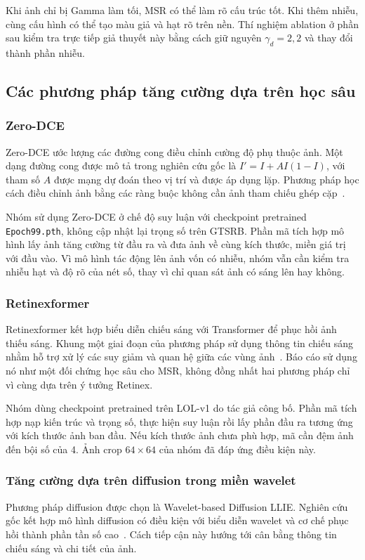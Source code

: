 Khi ảnh chỉ bị Gamma làm tối, MSR có thể làm rõ cấu trúc tốt. Khi thêm nhiễu, cùng cấu hình có thể tạo màu giả và hạt rõ trên nền. Thí nghiệm ablation ở phần sau kiểm tra trực tiếp giả thuyết này bằng cách giữ nguyên $\gamma_d=2,2$ và thay đổi thành phần nhiễu.

\subsection{Các phương pháp tăng cường dựa trên học sâu}
\subsubsection{Zero-DCE}
Zero-DCE ước lượng các đường cong điều chỉnh cường độ phụ thuộc ảnh. Một dạng đường cong được mô tả trong nghiên cứu gốc là $I'=I+A I(1-I)$, với tham số $A$ được mạng dự đoán theo vị trí và được áp dụng lặp. Phương pháp học cách điều chỉnh ảnh bằng các ràng buộc không cần ảnh tham chiếu ghép cặp~\cite{zerodce}.

Nhóm sử dụng Zero-DCE ở chế độ suy luận với checkpoint pretrained \texttt{Epoch99.pth}, không cập nhật lại trọng số trên GTSRB. Phần mã tích hợp mô hình lấy ảnh tăng cường từ đầu ra và đưa ảnh về cùng kích thước, miền giá trị với đầu vào. Vì mô hình tác động lên ảnh vốn có nhiễu, nhóm vẫn cần kiểm tra nhiễu hạt và độ rõ của nét số, thay vì chỉ quan sát ảnh có sáng lên hay không.

\subsubsection{Retinexformer}
Retinexformer kết hợp biểu diễn chiếu sáng với Transformer để phục hồi ảnh thiếu sáng. Khung một giai đoạn của phương pháp sử dụng thông tin chiếu sáng nhằm hỗ trợ xử lý các suy giảm và quan hệ giữa các vùng ảnh~\cite{retinexformer}. Báo cáo sử dụng nó như một đối chứng học sâu cho MSR, không đồng nhất hai phương pháp chỉ vì cùng dựa trên ý tưởng Retinex.

Nhóm dùng checkpoint pretrained trên LOL-v1 do tác giả công bố. Phần mã tích hợp nạp kiến trúc và trọng số, thực hiện suy luận rồi lấy phần đầu ra tương ứng với kích thước ảnh ban đầu. Nếu kích thước ảnh chưa phù hợp, mã cần đệm ảnh đến bội số của 4. Ảnh crop $64\times64$ của nhóm đã đáp ứng điều kiện này.

\subsubsection{Tăng cường dựa trên diffusion trong miền wavelet}
Phương pháp diffusion được chọn là Wavelet-based Diffusion LLIE. Nghiên cứu gốc kết hợp mô hình diffusion có điều kiện với biểu diễn wavelet và cơ chế phục hồi thành phần tần số cao~\cite{diffusion}. Cách tiếp cận này hướng tới cân bằng thông tin chiếu sáng và chi tiết của ảnh.

